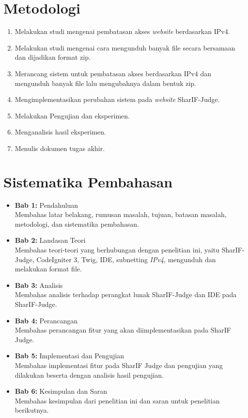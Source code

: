 \section{Metodologi}
\label{sec:metlit}
\begin{enumerate}
    \item Melakukan studi mengenai pembatasan akses \textit{website} berdasarkan IPv4.
    \item Melakukan studi mengenai cara mengunduh banyak file secara bersamaan dan dijadikan format zip.
    \item Merancang sistem untuk pembatasan akses berdasarkan IPv4 dan mengunduh banyak file lalu mengubahnya dalam bentuk zip.
    \item Mengimplementasikan perubahan sistem pada \textit{website} SharIF-Judge.
    \item Melakukan Pengujian dan eksperimen.
    \item Menganalisis hasil eksperimen.
    \item Menulis dokumen tugas akhir.
\end{enumerate}


\section{Sistematika Pembahasan}
\label{sec:sispem}
\begin{itemize}
    \item \textbf{Bab 1:} Pendahuluan \\
          Membahas latar belakang, rumusan masalah, tujuan, batasan masalah, metodologi, dan sistematika pembahasan.
    \item \textbf{Bab 2:} Landasan Teori \\
          Membahas teori-teori yang berhubungan dengan penelitian ini, yaitu SharIF-Judge, CodeIgniter 3, Twig, IDE, subnetting \textit{IPv4}, mengunduh dan melakukan format file.
    \item \textbf{Bab 3:} Analisis \\
          Membahas analisis terhadap perangkat lunak SharIF-Judge dan IDE pada SharIF-Judge.
    \item \textbf{Bab 4:} Perancangan \\
          Membahas perancangan fitur yang akan diimplementasikan pada SharIF Judge.
    \item \textbf{Bab 5:} Implementasi dan Pengujian \\
          Membahas implementasi fitur pada SharIF Judge dan pengujian yang dilakukan beserta dengan analisis hasil pengujian.
    \item \textbf{Bab 6:} Kesimpulan dan Saran \\
          Membahas kesimpulan dari penelitian ini dan saran untuk penelitian berikutnya.
\end{itemize}